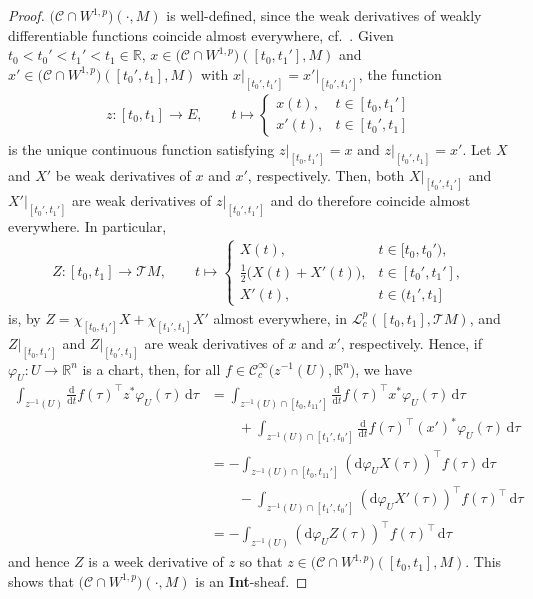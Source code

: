 \documentclass[preprint,12pt]{elsarticle}
\theoremstyle{definition}
\begin{document}
\begin{proof}
$\big(\mathcal{C}\cap W^{1,p}\big)(\cdot,M)$ is well-defined, since the weak derivatives of weakly differentiable functions coincide almost everywhere, cf.~\cite[Proposition 1.5]{ConvScha16}. Given $t_0<t_0'<t_1'<t_1\in\mathbb{R}$, $x\in\big(\mathcal{C}\cap W^{1,p}\big)([t_0,t_1'],M)$ and $x'\in\big(\mathcal{C}\cap W^{1,p}\big)([t_0',t_1],M)$ with $x\vert_{[t_0',t_1']} = x'\vert_{[t_0',t_1']}$, the function 
\begin{align*}
z: [t_0,t_1]\to E,\qquad t\mapsto\begin{cases}
x(t), & t\in[t_0,t_1']\\
x'(t), & t\in[t_0',t_1]
\end{cases}
\end{align*}
is the unique continuous function satisfying $z\vert_{[t_0,t_1']} = x$ and $z\vert_{[t_0',t_1]} = x'$. Let $X$ and $X'$ be weak derivatives of $x$ and $x'$, respectively. Then, both $X\vert_{[t_0',t_1']}$ and $X'\vert_{[t_0',t_1']}$ are weak derivatives of $z\vert_{[t_0',t_1']}$ and do therefore coincide almost everywhere. In particular,
\begin{align*}
Z:[t_0,t_1]\to \mathcal{T}M,\qquad t\mapsto\begin{cases}
X(t), & t\in[t_0,t_0'),\\
\frac{1}{2}\big(X(t)+X'(t)\big), & t\in [t_0',t_1'],\\
X'(t), & t\in(t_1',t_1]
\end{cases}
\end{align*}
is, by $Z = \chi_{[t_0,t_1']}X+\chi_{[t_1',t_1]}X'$ almost everywhere, in $\mathcal{L}^p_c([t_0,t_1],\mathcal{T}M)$, and $Z\vert_{[t_0,t_1']}$ and $Z\vert_{[t_0',t_1]}$ are weak derivatives of $x$ and $x'$, respectively. Hence, if $\varphi_U:U\to\mathbb{R}^n$ is a chart, then, for all $f\in\mathcal{C}_c^\infty\big(z^{-1}(U),\mathbb{R}^n\big)$, we have
\begin{align*}
\int_{z^{-1}(U)}\tfrac{\mathrm{d}}{\mathrm{d}t}f(\tau)^\top z^*\varphi_U(\tau)\,\mathrm{d}\tau & = \int_{z^{-1}(U)\cap[t_0,t_11']}\tfrac{\mathrm{d}}{\mathrm{d}t}f(\tau)^\top x^*\varphi_U(\tau)\,\mathrm{d}\tau\\
&\qquad +\int_{z^{-1}(U)\cap[t_1',t_0']}\tfrac{\mathrm{d}}{\mathrm{d}t}f(\tau)^\top (x')^*\varphi_U(\tau)\,\mathrm{d}\tau\\
& = -\int_{z^{-1}(U)\cap[t_0,t_11']} (\mathrm{d}\varphi_U
X(\tau))^\top f(\tau)\,\mathrm{d}\tau\\
&\qquad -\int_{z^{-1}(U)\cap[t_1',t_0']}(\mathrm{d}\varphi_U
X'(\tau))^\top f(\tau)^\top\,\mathrm{d}\tau\\
& = -\int_{z^{-1}(U)}(\mathrm{d}\varphi_U
Z(\tau))^\top f(\tau)^\top\,\mathrm{d}\tau
\end{align*}
and hence $Z$ is a week derivative of $z$ so that $z\in\big(\mathcal{C}\cap W^{1,p}\big)([t_0,t_1],M)$. This shows that $\big(\mathcal{C}\cap W^{1,p}\big)(\cdot,M)$ is an \textbf{Int}-sheaf.
\end{proof}
\end{document}
